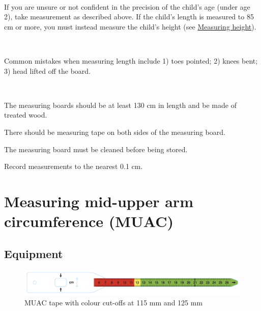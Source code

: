 \documentclass[12pt,]{book}
\theoremstyle{definition}
\theoremstyle{definition}
\theoremstyle{definition}
\theoremstyle{remark}
\let\BeginKnitrBlock\begin \let\EndKnitrBlock\end
\begin{document}
~

\BeginKnitrBlock{rmdnote}
If you are unsure or not confident in the precision of the child's age
(under age 2), take measurement as described above. If the child's
length is measured to 85 cm or more, you must instead measure the
child's height (see \protect\hyperlink{measuring-height}{Measuring
height}).
\EndKnitrBlock{rmdnote}

~

\BeginKnitrBlock{rmdwarning}
Common mistakes when measuring length include 1) toes pointed; 2) knees
bent; 3) head lifted off the board.
\EndKnitrBlock{rmdwarning}

~

\BeginKnitrBlock{rmdremind}
\item 

The measuring boards should be at least 130 cm in length and be made of
treated wood.

\item 

There should be measuring tape on both sides of the measuring board.

\item 

The measuring board must be cleaned before being stored.

\item 

Record measurements to the nearest 0.1 cm.
\EndKnitrBlock{rmdremind}

\hypertarget{muac}{%
\chapter{Measuring mid-upper arm circumference (MUAC)}\label{muac}}

\hypertarget{equipment-2}{%
\section{Equipment}\label{equipment-2}}

\begin{figure}

{\centering \includegraphics[width=13.11in]{images/muac01} 

}

\caption{MUAC tape with colour cut-offs at 115 mm and 125 mm}\label{fig:muac1}
\end{figure}
\end{document}
